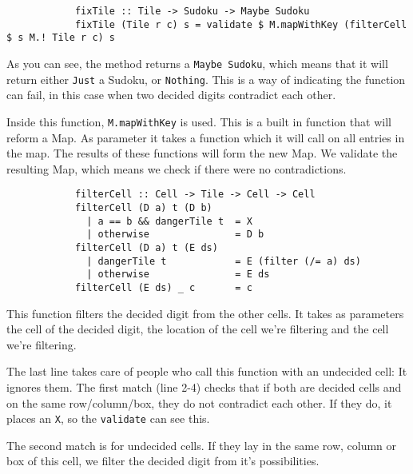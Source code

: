 \documentclass[a4paper,12pt]{article}
\begin{document}
\begin{section}
\begin{subsection}
\begin{subsubsection}
            \begin{lstlisting}
            fixTile :: Tile -> Sudoku -> Maybe Sudoku
            fixTile (Tile r c) s = validate $ M.mapWithKey (filterCell $ s M.! Tile r c) s
            \end{lstlisting}

            As you can see, the method returns a \texttt{Maybe Sudoku}, which
            means that it will return either \texttt{Just} a Sudoku, or
            \texttt{Nothing}. This is a way of indicating the function can fail,
            in this case when two decided digits contradict each other.

            Inside this function, \texttt{M.mapWithKey} is used. This is a built
            in function that will reform a Map. As parameter it takes a
            function which it will call on all entries in the map. The results of
            these functions will form the new Map. We validate the resulting
            Map, which means we check if there were no contradictions.

            \begin{lstlisting}
            filterCell :: Cell -> Tile -> Cell -> Cell
            filterCell (D a) t (D b)
              | a == b && dangerTile t  = X
              | otherwise               = D b
            filterCell (D a) t (E ds)
              | dangerTile t            = E (filter (/= a) ds)
              | otherwise               = E ds
            filterCell (E ds) _ c       = c
            \end{lstlisting}

            This function filters the decided digit from the other cells. It
            takes as parameters the cell of the decided digit, the location of
            the cell we're filtering and the cell we're filtering.

            The last line takes care of people who call this function with an
            undecided cell: It ignores them. The first match (line 2-4) checks
            that if both are decided cells and on the same row/column/box, they
            do not contradict each other. If they do, it places an \texttt{X},
            so the \texttt{validate} can see this.

            The second match is for undecided cells. If they lay in the same
            row, column or box of this cell, we filter the decided digit from
            it's possibilities.

        \end{subsubsection}



\end{subsection}
\end{section}
\end{document}
